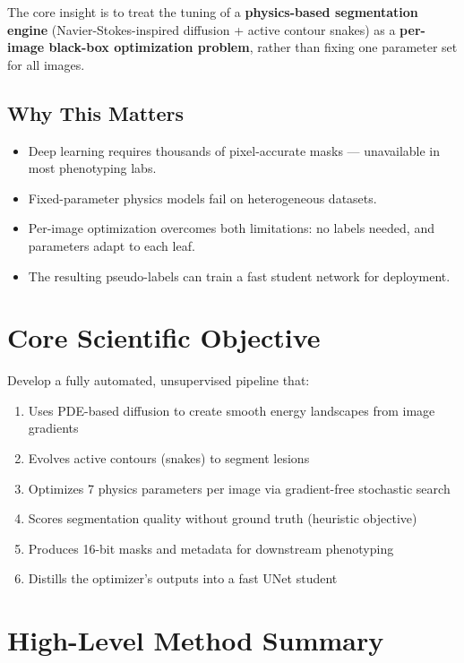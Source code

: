 \documentclass[11pt,a4paper]{article}
\begin{document}
The core insight is to treat the tuning of a \textbf{physics-based segmentation engine} (Navier-Stokes-inspired diffusion + active contour snakes) as a \textbf{per-image black-box optimization problem}, rather than fixing one parameter set for all images.

\subsection{Why This Matters}
\begin{itemize}[nosep]
  \item Deep learning requires thousands of pixel-accurate masks --- unavailable in most phenotyping labs.
  \item Fixed-parameter physics models fail on heterogeneous datasets.
  \item Per-image optimization overcomes both limitations: no labels needed, and parameters adapt to each leaf.
  \item The resulting pseudo-labels can train a fast student network for deployment.
\end{itemize}

\section{Core Scientific Objective}

Develop a fully automated, unsupervised pipeline that:
\begin{enumerate}[nosep]
  \item Uses PDE-based diffusion to create smooth energy landscapes from image gradients
  \item Evolves active contours (snakes) to segment lesions
  \item Optimizes 7 physics parameters per image via gradient-free stochastic search
  \item Scores segmentation quality without ground truth (heuristic objective)
  \item Produces 16-bit masks and metadata for downstream phenotyping
  \item Distills the optimizer's outputs into a fast UNet student
\end{enumerate}

\section{High-Level Method Summary}
\end{document}
